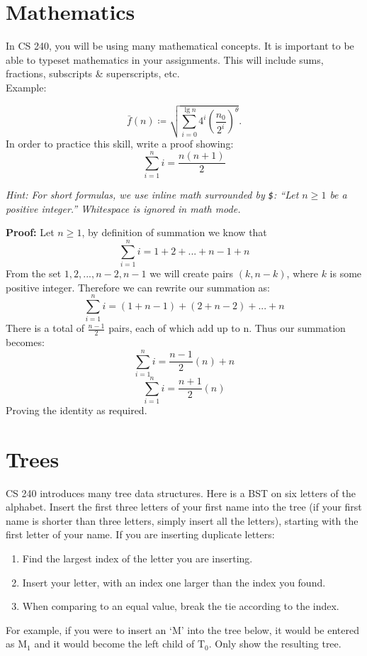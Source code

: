 \documentclass[12pt]{article}
\begin{document}
\section{Mathematics}
In CS 240, you will be using many mathematical concepts. It is important to be able to typeset mathematics in your assignments. This will include sums, fractions, subscripts \& superscripts, etc. \\
Example: 

\[ \bar{f}(n) \coloneqq \sqrt {\sum_{i=0}^{\lg n} 4^i \left ( \frac{n_0}{2^i} \right )^{\theta}}. \]
In order to practice this skill, write a proof showing: \[ \sum_{i=1}^n i = \frac {n(n+1)} {2} \]

{\itshape
	Hint: For short formulas, we use inline math surrounded by \texttt{\$}: 
 	``Let $n\geq 1$ be a positive integer.''
	Whitespace is ignored in math mode.
}


\textbf{ Proof: } Let $n\geq 1$, by definition of summation we know that 
\[ \sum_{i=1}^n i = 1 + 2 + ... + n-1 + n \]
From the set ${1, 2, ..., n-2, n-1}$ we will create pairs $(k, n-k)$, where $k$ is some positive integer. Therefore we can rewrite our summation as: 
\[ \sum_{i=1}^n i = (1 + n-1) + (2 + n - 2) + ... + n \]
There is a total of $\frac{n-1}{2}$ pairs, each of which add up to n. Thus our summation becomes:
\[ \sum_{i=1}^n i = \frac{n-1}{2}(n) + n \]
\[ \sum_{i=1}^n i = \frac{n+1}{2}(n) \]
Proving the identity as required.

\section{Trees}

CS 240 introduces many tree data structures. Here is a BST on six letters of the 
alphabet. Insert the first three letters of your first name into the tree (if your first 
name is shorter than three letters, simply insert all the letters), starting 
with the first letter of your name. If you are inserting duplicate
letters:

%
\begin{enumerate}[(1)]
	\item Find the largest index of the letter you are inserting. 
	\item Insert your letter, with an index one larger than the index you found.
	\item When comparing to an equal value, break the tie according to the index.

\end{enumerate}
%
For example, if you were to insert an `M' into the tree below, 
it would be entered as $\mathrm{M}_1$ and it would become the left child of 
$\mathrm{T}_0$. Only show the resulting tree.
\end{document}
